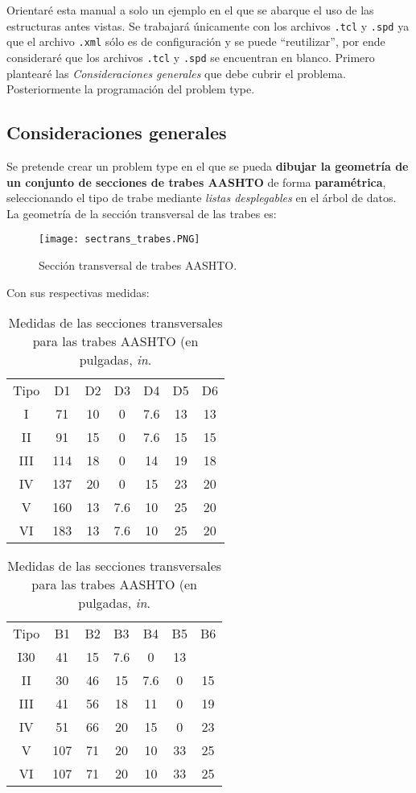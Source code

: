 \documentclass[10pt, a4paper, twocolumn]{article} %
\begin{document}
Orientaré esta manual a solo un ejemplo en el que se abarque el uso de las estructuras antes vistas. Se trabajará únicamente con los archivos \texttt{.tcl} y \texttt{.spd} ya que el archivo \texttt{.xml} sólo es de configuración y se puede ``reutilizar'', por ende consideraré que los archivos \texttt{.tcl} y \texttt{.spd} se encuentran en blanco. Primero plantearé las \textit{Consideraciones generales} que debe cubrir el problema. Posteriormente la programación del problem type. 

\subsection{Consideraciones generales}
\label{sec:consideraciones}
Se pretende crear un problem type en el que se pueda \textbf{dibujar la geometría de un conjunto de secciones de trabes AASHTO} de forma \textbf{paramétrica}, seleccionando el tipo de trabe mediante \textit{listas desplegables} en el árbol de datos. La geometría de la sección transversal de las trabes es:
\begin{figure}[hbt!]\centering
	\texttt{[image: sectrans\_trabes.PNG]}
	\label{fig:sectrans_trabes}
	\caption{Sección transversal de trabes AASHTO.}
\end{figure}

Con sus respectivas medidas:

\begin{table}[hbtp!]
\centering
	\label{tab:medidasAASHTO}
	\begin{tabular}{*{7}{c}}
		\rowcolor{BlueGiD!60} Tipo&D1&D2&D3&D4&D5&D6\\
		\rowcolor{BlueGiD!20} I&71&10&0&7.6&13&13\\
		II&91&15&0&7.6&15&15\\
		\rowcolor{BlueGiD!20}III&114&18&0&14&19&18\\
		IV&137&20&0&15&23&20\\
		\rowcolor{BlueGiD!20}V&160&13&7.6&10&25&20\\
		VI&183&13&7.6&10&25&20\\
	\end{tabular}
	\vspace{0.2cm}
	\begin{tabular}{*{7}{c}}
		\rowcolor{BlueGiD!60} Tipo&B1&B2&B3&B4&B5&B6\\
		\rowcolor{BlueGiD!20} I30&41&15&7.6&0&13\\
		II&30&46&15&7.6&0&15\\
		\rowcolor{BlueGiD!20}III&41&56&18&11&0&19\\
		IV&51&66&20&15&0&23\\
		\rowcolor{BlueGiD!20}V&107&71&20&10&33&25\\
		VI&107&71&20&10&33&25\\
	\end{tabular}
	\caption{Medidas de las secciones transversales para las trabes AASHTO (en pulgadas, \textit{in}.}
\end{table}
\end{document}
